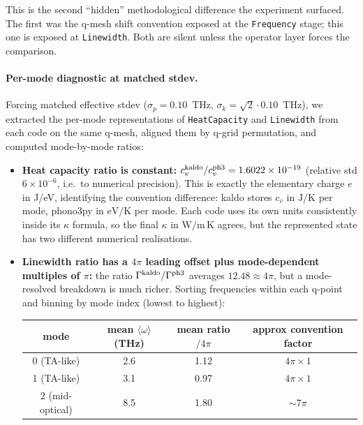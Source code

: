 \documentclass[11pt,a4paper]{article}
\begin{document}
\medskip
This is the second ``hidden'' methodological difference the experiment surfaced. The
first was the q-mesh shift convention exposed at the \texttt{Frequency} stage; this
one is exposed at \texttt{Linewidth}. Both are silent unless the operator layer forces
the comparison.

\paragraph{Per-mode diagnostic at matched stdev.} Forcing matched effective stdev
($\sigma_p = 0.10$~THz, $\sigma_k = \sqrt{2}\cdot 0.10$~THz), we extracted the per-mode
representations of \texttt{HeatCapacity} and \texttt{Linewidth} from each code on the
same q-mesh, aligned them by q-grid permutation, and computed mode-by-mode ratios:

\begin{itemize}[leftmargin=2em, itemsep=2pt]
  \item \textbf{Heat capacity ratio is constant:} $c_v^{\rm kaldo}/c_v^{\rm ph3} = 1.6022\times 10^{-19}$
        (relative std $6\times 10^{-6}$, i.e.\ to numerical precision). This is exactly the elementary
        charge $e$ in J/eV, identifying the convention difference: kaldo stores $c_v$ in $\mathrm{J/K}$
        per mode, phono3py in $\mathrm{eV/K}$ per mode. Each code uses its own units consistently inside
        its $\kappa$ formula, so the final $\kappa$ in $\mathrm{W/m\,K}$ agrees, but the represented
        state has two different numerical realisations.
  \item \textbf{Linewidth ratio has a $4\pi$ leading offset plus mode-dependent multiples of $\pi$:}
        the ratio $\Gamma^{\rm kaldo}/\Gamma^{\rm ph3}$ averages $12.48 \approx 4\pi$, but a
        mode-resolved breakdown is much richer. Sorting frequencies within each q-point and binning
        by mode index (lowest to highest):
        \begin{center}
        \renewcommand{\arraystretch}{1.1}
        \footnotesize
        \begin{tabular}{c|c|c|c}
        \toprule
        mode & mean $\langle\omega\rangle$ (THz) & mean ratio$/4\pi$ & approx convention factor \\
        \midrule
        0 (TA-like)        & 2.6  & 1.12 & $4\pi \times 1$  \\
        1 (TA-like)        & 3.1  & 0.97 & $4\pi \times 1$  \\
        2 (mid-optical)    & 8.5  & 1.80 & $\sim 7\pi$      \\

\end{tabular}
\end{center}
\end{itemize}
\end{document}
